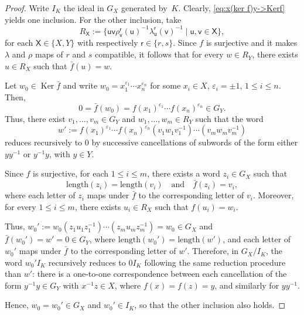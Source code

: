 \documentclass[12pt, a4paper, english]{article}
\theoremstyle{definition}
\theoremstyle{remark}
\DeclareMathOperator{\Ker}{Ker}
\begin{document}
\begin{proof}
Write $I_K$ the ideal in $G_X$ generated by~$K$. Clearly, \eqref{eq:x(ker f)y->Kerf} yields one inclusion. For the other inclusion, take 
\[ R_{\mathsf{X}} := \{ \mathsf{u}\mathsf{v}\rho_{\mathsf{v}}^{\mathsf{r}}(\mathsf{u})^{-1}\lambda_{\mathsf{u}}^{\mathsf{r}}(\mathsf v)^{-1} \mid \mathsf{u,v} \in \mathsf{X}\},\] for each $\mathsf{X}\in \{X,Y\}$ with respectively $\mathsf{r}\in \{r,s\}$. Since $f$ is surjective and it makes $\lambda$ and $\rho$ maps of $r$ and $s$ compatible, it follows that for every $w\in R_Y$, there exists $u \in R_X$ such that $\bar f(u) = w$.



Let $w_0 \in \Ker \bar f$ and write $w_0 = x_1^{\varepsilon_1}\cdots x_n^{\varepsilon_n}$ for some $x_i \in X$, $\varepsilon_i =\pm 1$, $1\leq i \leq n$. Then,
\[ 0 = \bar f(w_0) = f(x_1)^{\varepsilon_1}\cdots f(x_n)^{\varepsilon_n} \in G_Y.\]
Thus, there exist $v_1, \ldots, v_m \in G_Y$ and $w_1, \ldots, w_m \in R_Y$ such that the word
\[
w':= f(x_1)^{\varepsilon_1} \cdots f(x_n)^{\varepsilon_n} (v_1 w_1 v_1^{-1}) \cdots (v_m w_m v_m^{-1})
\]
reduces recursively to $0$
by successive cancellations of subwords of the form either $yy^{-1}$ or $y^{-1}y$, with $y \in Y$.

Since $f$ is surjective, for each $1 \leq i \leq m$, there exists a word $z_i \in G_X$ such that
\[
\mathrm{length}(z_i) = \mathrm{length}(v_i)\quad\text{and} \quad \bar f(z_i) = v_i,
\]
where each letter of $z_i$ maps under $\bar f$ to the corresponding letter of $v_i$. Moreover, for every $1\leq i \leq m$, there exists $u_i \in R_X$ such that $f(u_i)=w_i$.

Thus, $w_0':= w_0(z_1u_1z_1^{-1})\cdots (z_mu_mz_m^{-1}) = w_0 \in G_X$ and $\bar f(w_0') = w' = 0 \in G_Y$, where $\mathrm{length}(w_0') = \mathrm{length}(w')$, and each letter of $w_0'$ maps under $\bar f$ to the corresponding letter of $w'$. Therefore, in $G_X/I_K$, the word $w_0'I_K$ recursively reduces to $0I_K$ following the same reduction procedure than $w'$: there is a one-to-one correspondence between each cancellation of the form $y^{-1}y \in G_Y$ with $x^{-1}z \in X$, where $f(x) = f(z) = y$, and similarly for $yy^{-1}$.

Hence, $w_0 = w_0'\in G_X$ and $w_0' \in I_K$, so that the other inclusion also holds.
\end{proof}
\end{document}
